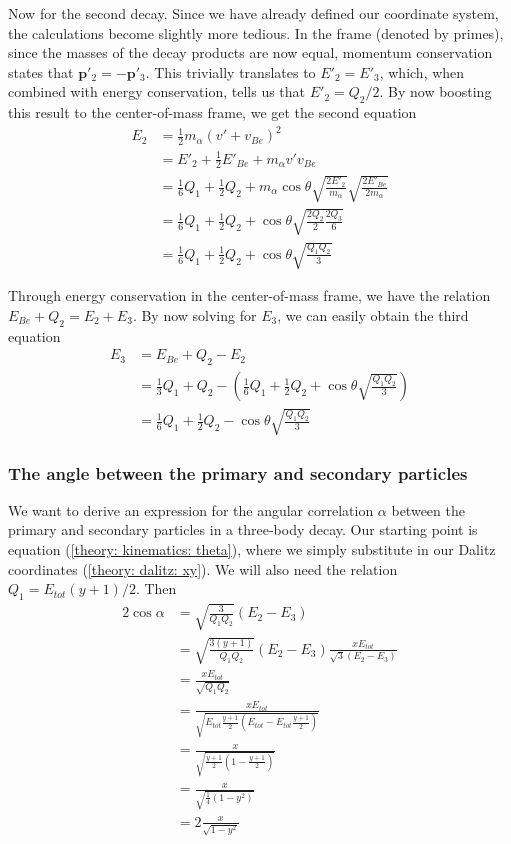 Now for the second decay. Since we have already defined our coordinate system, the calculations become slightly more tedious. In the  frame (denoted by primes), since the masses of the decay products are now equal, momentum conservation states that $\bm{p}'_2 = -\bm{p}'_3$. This trivially translates to $E'_2 = E'_3$, which, when combined with energy conservation, tells us that $E'_2 = Q_2/2$. By now boosting this result to the center-of-mass frame, we get the second equation
\begin{align*}
	E_2 &= \frac{1}{2}m_{\alpha}(v'+v_{Be})^2 \\
	&= E'_2 + \frac{1}{2}E'_{Be} + m_{\alpha}v'v_{Be} \\
	&= \frac{1}{6}Q_1 + \frac{1}{2}Q_2 + m_{\alpha}\cos\theta \sqrt{\frac{2E'_2}{m_{\alpha}}}\sqrt{\frac{2E'_{Be}}{2m_{\alpha}}} \\
	&= \frac{1}{6}Q_1 + \frac{1}{2}Q_2 + \cos\theta\sqrt{\frac{2Q_2}{2}\frac{2Q_3}{6}} \\
	&= \frac{1}{6}Q_1 + \frac{1}{2}Q_2 + \cos\theta\sqrt{\frac{Q_1Q_2}{3}}
\end{align*}

Through energy conservation in the center-of-mass frame, we have the relation $E_{Be} + Q_2 = E_2 + E_3$. By now solving for $E_3$, we can easily obtain the third equation
\begin{align*}
	E_3 &= E_{Be} + Q_2 - E_2 \\
	&= \frac{1}{3}Q_1 + Q_2 - (\frac{1}{6}Q_1 + \frac{1}{2}Q_2 + \cos\theta\sqrt{\frac{Q_1Q_2}{3}}) \\
	&= \frac{1}{6}Q_1 + \frac{1}{2}Q_2 - \cos\theta\sqrt{\frac{Q_1Q_2}{3}}
\end{align*}

\subsubsection{The angle between the primary and secondary particles}
We want to derive an expression for the angular correlation $\alpha$ between the primary and secondary particles in a three-body decay. Our starting point is equation (\ref{theory: kinematics: theta}), where we simply substitute in our Dalitz coordinates (\ref{theory: dalitz: xy}). We will also need the relation $Q_1 = E_{tot}(y+1)/2$. Then
\begin{align*}
	2\cos\alpha &= \sqrt{\frac{3}{Q_1 Q_2}}(E_2 - E_3) \\
	&= \sqrt{\frac{3(y+1)}{Q_1 Q_2}}(E_2 - E_3) \frac{x E_{tot}}{\sqrt{3}(E_2 - E_3)} \\
	&= \frac{x E_{tot}}{\sqrt{Q_1 Q_2}} \\
	&= \frac{xE_{tot}}{\sqrt{E_{tot}\frac{y+1}{2}(E_{tot} - E_{tot}\frac{y+1}{2})}} \\
	&= \frac{x}{\sqrt{\frac{y+1}{2}(1 - \frac{y+1}{2})}} \\
	&= \frac{x}{\sqrt{\frac{1}{4}(1-y^2)}} \\
	&= 2\frac{x}{\sqrt{1-y^2}}
\end{align*}

